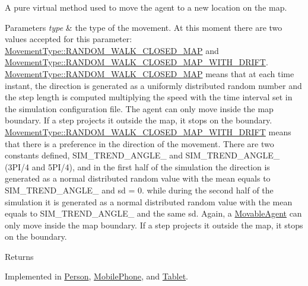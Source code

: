 A pure virtual method used to move the agent to a new location on the map. 
\begin{DoxyParams}{Parameters}
{\em type} & the type of the movement. At this moment there are two values accepted for this parameter\+: \mbox{\hyperlink{_movement_type_8h_a8a93b61bc797a7d1907f42796a252493a1260a39bdcc19395a0085be09746f9d0}{Movement\+Type\+::\+R\+A\+N\+D\+O\+M\+\_\+\+W\+A\+L\+K\+\_\+\+C\+L\+O\+S\+E\+D\+\_\+\+M\+AP}} and \mbox{\hyperlink{_movement_type_8h_a8a93b61bc797a7d1907f42796a252493a19d5a14b0e46bf765f243b7e2b7b8810}{Movement\+Type\+::\+R\+A\+N\+D\+O\+M\+\_\+\+W\+A\+L\+K\+\_\+\+C\+L\+O\+S\+E\+D\+\_\+\+M\+A\+P\+\_\+\+W\+I\+T\+H\+\_\+\+D\+R\+I\+FT}}. \mbox{\hyperlink{_movement_type_8h_a8a93b61bc797a7d1907f42796a252493a1260a39bdcc19395a0085be09746f9d0}{Movement\+Type\+::\+R\+A\+N\+D\+O\+M\+\_\+\+W\+A\+L\+K\+\_\+\+C\+L\+O\+S\+E\+D\+\_\+\+M\+AP}} means that at each time instant, the direction is generated as a uniformly distributed random number and the step length is computed multiplying the speed with the time interval set in the simulation configuration file. The agent can only move inside the map boundary. If a step projects it outside the map, it stops on the boundary. \mbox{\hyperlink{_movement_type_8h_a8a93b61bc797a7d1907f42796a252493a19d5a14b0e46bf765f243b7e2b7b8810}{Movement\+Type\+::\+R\+A\+N\+D\+O\+M\+\_\+\+W\+A\+L\+K\+\_\+\+C\+L\+O\+S\+E\+D\+\_\+\+M\+A\+P\+\_\+\+W\+I\+T\+H\+\_\+\+D\+R\+I\+FT}} means that there is a preference in the direction of the movement. There are two constants defined, S\+I\+M\+\_\+\+T\+R\+E\+N\+D\+\_\+\+A\+N\+G\+L\+E\+\_ and S\+I\+M\+\_\+\+T\+R\+E\+N\+D\+\_\+\+A\+N\+G\+L\+E\+\_ (3P\+I/4 and 5P\+I/4), and in the first half of the simulation the direction is generated as a normal distributed random value with the mean equals to S\+I\+M\+\_\+\+T\+R\+E\+N\+D\+\_\+\+A\+N\+G\+L\+E\+\_ and sd = 0. while during the second half of the simulation it is generated as a normal distributed random value with the mean equals to S\+I\+M\+\_\+\+T\+R\+E\+N\+D\+\_\+\+A\+N\+G\+L\+E\+\_ and the same sd. Again, a \mbox{\hyperlink{class_movable_agent}{Movable\+Agent}} can only move inside the map boundary. If a step projects it outside the map, it stops on the boundary. \\
\hline
\end{DoxyParams}
\begin{DoxyReturn}{Returns}

\end{DoxyReturn}


Implemented in \mbox{\hyperlink{class_person_a89843e85f14abc08422273c20252ae23}{Person}}, \mbox{\hyperlink{class_mobile_phone_a92d77fa5810ddb9c4c482d9c9baea456}{Mobile\+Phone}}, and \mbox{\hyperlink{class_tablet_a0021a8d61f496d84540f675b1cb7d080}{Tablet}}.

